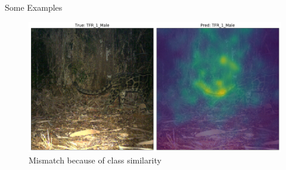 \documentclass[10pt]{beamer}
\begin{document}
\begin{frame}{Some Examples}
	\centering
	\begin{figure}
		\includegraphics[width=\columnwidth]{images/finetune_Attention_later.png}
		\caption{Mismatch because of class similarity}
	\end{figure}
\end{frame}

%		
%		
%		
%		


{\1
\begin{frame}
\end{frame}}
\end{document}

